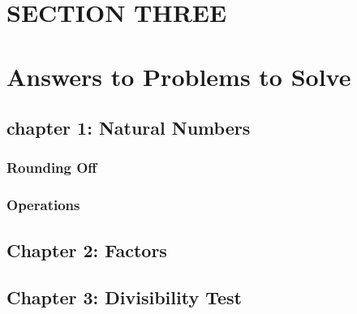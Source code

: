 \documentclass[
  letterpaper,
  DIV=11,
  numbers=noendperiod]{scrreprt}
\begin{document}

\hypertarget{section-three}{%
\chapter*{SECTION THREE}\label{section-three}}



\hypertarget{answers-to-problems-to-solve}{%
\chapter*{Answers to Problems to
Solve}\label{answers-to-problems-to-solve}}


\hypertarget{chapter-1-natural-numbers-1}{%
\section*{chapter 1: Natural
Numbers}\label{chapter-1-natural-numbers-1}}


\hypertarget{rounding-off-1}{%
\subsection*{Rounding Off}\label{rounding-off-1}}

\hypertarget{operations-1}{%
\subsection*{Operations}\label{operations-1}}

\hypertarget{chapter-2-factors-1}{%
\section*{Chapter 2: Factors}\label{chapter-2-factors-1}}


\hypertarget{chapter-3-divisibility-test}{%
\section*{Chapter 3: Divisibility
Test}\label{chapter-3-divisibility-test}}
\end{document}
